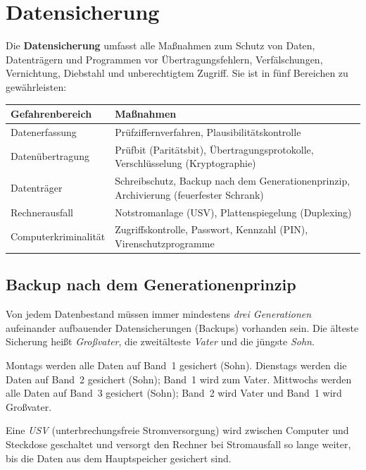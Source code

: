 \documentclass[11pt, a4paper]{article}
\begin{document}
\section{Datensicherung}

Die \textbf{Datensicherung} umfasst alle Maßnahmen zum Schutz von Daten, Datenträgern
und Programmen vor Übertragungsfehlern, Verfälschungen, Vernichtung, Diebstahl und
unberechtigtem Zugriff. Sie ist in fünf Bereichen zu gewährleisten:

\begin{center}
\begin{tabular}{p{3.4cm} p{8.4cm}}
\toprule
\textbf{Gefahrenbereich} & \textbf{Maßnahmen}\\
\midrule
Datenerfassung & Prüfziffernverfahren, Plausibilitätskontrolle\\
Datenübertragung & Prüfbit (Paritätsbit), Übertragungsprotokolle, Verschlüsselung (Kryptographie)\\
Datenträger & Schreibschutz, Backup nach dem Generationenprinzip, Archivierung (feuerfester Schrank)\\
Rechnerausfall & Notstromanlage (USV), Plattenspiegelung (Duplexing)\\
Computerkriminalität & Zugriffskontrolle, Passwort, Kennzahl (PIN), Virenschutzprogramme\\
\bottomrule
\end{tabular}
\end{center}

\subsection{Backup nach dem Generationenprinzip}

Von jedem Datenbestand müssen immer mindestens \emph{drei Generationen} aufeinander
aufbauender Datensicherungen (Backups) vorhanden sein. Die älteste Sicherung heißt
\emph{Großvater}, die zweitälteste \emph{Vater} und die jüngste \emph{Sohn}.

\begin{beispiel}
Montags werden alle Daten auf Band~1 gesichert (\glqq Sohn\grqq). Dienstags werden die
Daten auf Band~2 gesichert (\glqq Sohn\grqq); Band~1 wird zum \glqq Vater\grqq.
Mittwochs werden alle Daten auf Band~3 gesichert (\glqq Sohn\grqq); Band~2 wird
\glqq Vater\grqq{} und Band~1 wird \glqq Großvater\grqq.
\end{beispiel}

Eine \emph{USV} (unterbrechungsfreie Stromversorgung) wird zwischen Computer und
Steckdose geschaltet und versorgt den Rechner bei Stromausfall so lange weiter, bis
die Daten aus dem Hauptspeicher gesichert sind.
\end{document}
